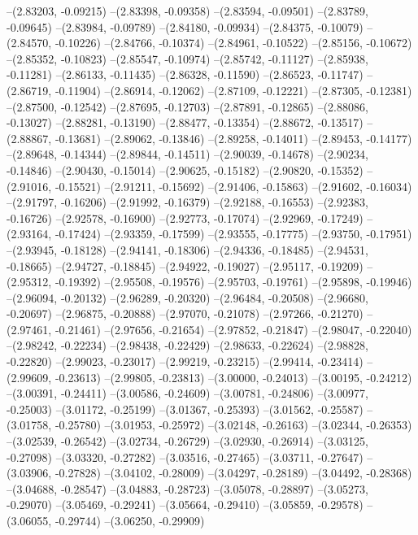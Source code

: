 --(2.83203, -0.09215)
--(2.83398, -0.09358)
--(2.83594, -0.09501)
--(2.83789, -0.09645)
--(2.83984, -0.09789)
--(2.84180, -0.09934)
--(2.84375, -0.10079)
--(2.84570, -0.10226)
--(2.84766, -0.10374)
--(2.84961, -0.10522)
--(2.85156, -0.10672)
--(2.85352, -0.10823)
--(2.85547, -0.10974)
--(2.85742, -0.11127)
--(2.85938, -0.11281)
--(2.86133, -0.11435)
--(2.86328, -0.11590)
--(2.86523, -0.11747)
--(2.86719, -0.11904)
--(2.86914, -0.12062)
--(2.87109, -0.12221)
--(2.87305, -0.12381)
--(2.87500, -0.12542)
--(2.87695, -0.12703)
--(2.87891, -0.12865)
--(2.88086, -0.13027)
--(2.88281, -0.13190)
--(2.88477, -0.13354)
--(2.88672, -0.13517)
--(2.88867, -0.13681)
--(2.89062, -0.13846)
--(2.89258, -0.14011)
--(2.89453, -0.14177)
--(2.89648, -0.14344)
--(2.89844, -0.14511)
--(2.90039, -0.14678)
--(2.90234, -0.14846)
--(2.90430, -0.15014)
--(2.90625, -0.15182)
--(2.90820, -0.15352)
--(2.91016, -0.15521)
--(2.91211, -0.15692)
--(2.91406, -0.15863)
--(2.91602, -0.16034)
--(2.91797, -0.16206)
--(2.91992, -0.16379)
--(2.92188, -0.16553)
--(2.92383, -0.16726)
--(2.92578, -0.16900)
--(2.92773, -0.17074)
--(2.92969, -0.17249)
--(2.93164, -0.17424)
--(2.93359, -0.17599)
--(2.93555, -0.17775)
--(2.93750, -0.17951)
--(2.93945, -0.18128)
--(2.94141, -0.18306)
--(2.94336, -0.18485)
--(2.94531, -0.18665)
--(2.94727, -0.18845)
--(2.94922, -0.19027)
--(2.95117, -0.19209)
--(2.95312, -0.19392)
--(2.95508, -0.19576)
--(2.95703, -0.19761)
--(2.95898, -0.19946)
--(2.96094, -0.20132)
--(2.96289, -0.20320)
--(2.96484, -0.20508)
--(2.96680, -0.20697)
--(2.96875, -0.20888)
--(2.97070, -0.21078)
--(2.97266, -0.21270)
--(2.97461, -0.21461)
--(2.97656, -0.21654)
--(2.97852, -0.21847)
--(2.98047, -0.22040)
--(2.98242, -0.22234)
--(2.98438, -0.22429)
--(2.98633, -0.22624)
--(2.98828, -0.22820)
--(2.99023, -0.23017)
--(2.99219, -0.23215)
--(2.99414, -0.23414)
--(2.99609, -0.23613)
--(2.99805, -0.23813)
--(3.00000, -0.24013)
--(3.00195, -0.24212)
--(3.00391, -0.24411)
--(3.00586, -0.24609)
--(3.00781, -0.24806)
--(3.00977, -0.25003)
--(3.01172, -0.25199)
--(3.01367, -0.25393)
--(3.01562, -0.25587)
--(3.01758, -0.25780)
--(3.01953, -0.25972)
--(3.02148, -0.26163)
--(3.02344, -0.26353)
--(3.02539, -0.26542)
--(3.02734, -0.26729)
--(3.02930, -0.26914)
--(3.03125, -0.27098)
--(3.03320, -0.27282)
--(3.03516, -0.27465)
--(3.03711, -0.27647)
--(3.03906, -0.27828)
--(3.04102, -0.28009)
--(3.04297, -0.28189)
--(3.04492, -0.28368)
--(3.04688, -0.28547)
--(3.04883, -0.28723)
--(3.05078, -0.28897)
--(3.05273, -0.29070)
--(3.05469, -0.29241)
--(3.05664, -0.29410)
--(3.05859, -0.29578)
--(3.06055, -0.29744)
--(3.06250, -0.29909)

